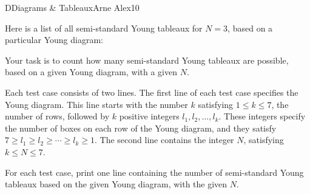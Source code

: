 \begin{icpcproblem}{D}{Diagrams \& Tableaux}{Arne Alex}{10}
{\raggedright
Here is a list of all semi-standard Young
tableaux for $N=3$, based on a particular Young diagram:
\par}

\begin{figure}[h]
\centering
{}
\end{figure}

Your task is to count how many semi-standard Young tableaux are possible, based on
a given Young diagram, with a given $N$.


Each test case consists of two lines. The first line of each test case specifies the Young diagram. This line starts with the number $k$ satisfying $1\le{}k \le{}7$, the number of rows, followed by $k$ positive integers $l_1,l_2,\ldots,l_k$. These integers specify the number of
boxes on each row of the Young diagram, and they satisfy $7\ge{}l_1\ge{}l_2\ge\cdots\ge{}l_k\ge{}1$.
The second line contains the integer $N$,
satisfying $k\le{}N\le{}7$.


For each test case, print one line containing the number of
semi-standard Young tableaux based on the given Young diagram, with the
given $N$.

\clearpage
{}

\end{icpcproblem}
